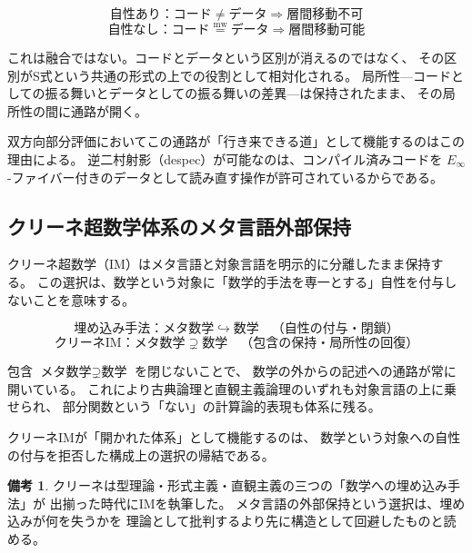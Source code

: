 \documentclass[11pt,a4paper]{article}
\theoremstyle{definition}
\newtheorem{remark}{備考}[section]
\newcommand{\mweq}{\mathrel{\overset{\mathrm{mw}}{=}}}
\newcommand{\Einfty}{E_\infty}
\begin{document}
\begin{equation}
\text{自性あり}：\text{コード} \neq \text{データ} \Rightarrow \text{層間移動不可}
\end{equation}
\begin{equation}
\text{自性なし}：\text{コード} \mweq \text{データ} \Rightarrow \text{層間移動可能}
\end{equation}

これは融合ではない。コードとデータという区別が消えるのではなく、
その区別がS式という共通の形式の上での役割として相対化される。
局所性---コードとしての振る舞いとデータとしての振る舞いの差異---は保持されたまま、
その局所性の間に通路が開く。

双方向部分評価においてこの通路が「行き来できる道」として機能するのはこの理由による。
逆二村射影（despec）が可能なのは、コンパイル済みコードを
$\Einfty$-ファイバー付きのデータとして読み直す操作が許可されているからである。

\subsection{クリーネ超数学体系のメタ言語外部保持}

クリーネ超数学（IM）はメタ言語と対象言語を明示的に分離したまま保持する。
この選択は、数学という対象に「数学的手法を専一とする」自性を付与しないことを意味する。

\begin{equation}
\text{埋め込み手法}：\text{メタ数学} \hookrightarrow \text{数学} \quad
\text{（自性の付与・閉鎖）}
\end{equation}
\begin{equation}
\text{クリーネIM}：\text{メタ数学} \supsetneq \text{数学} \quad
\text{（包含の保持・局所性の回復）}
\end{equation}

包含 $\text{メタ数学} \supsetneq \text{数学}$ を閉じないことで、
数学の外からの記述への通路が常に開いている。
これにより古典論理と直観主義論理のいずれも対象言語の上に乗せられ、
部分関数という「ない」の計算論的表現も体系に残る。

クリーネIMが「開かれた体系」として機能するのは、
数学という対象への自性の付与を拒否した構成上の選択の帰結である。

\begin{remark}
クリーネは型理論・形式主義・直観主義の三つの「数学への埋め込み手法」が
出揃った時代にIMを執筆した。
メタ言語の外部保持という選択は、埋め込みが何を失うかを
理論として批判するより先に構造として回避したものと読める。
\end{remark}
\end{document}
